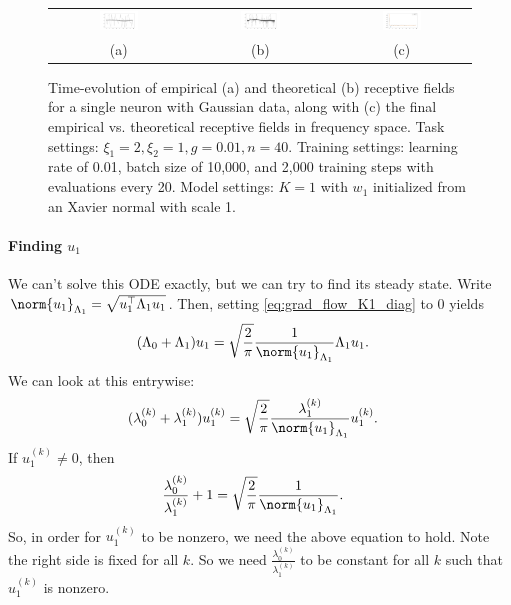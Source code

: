 \documentclass{article}
\begin{document}
\begin{figure}
  \centering
  \begin{tabular}{ccc}
    \includegraphics[width=0.3\textwidth]{../figs/math/long_range_experiment.png}
    & \includegraphics[width=0.3\textwidth]{../figs/math/long_range_theory.png}
    & \includegraphics[width=0.3\textwidth]{../figs/math/theory_vs_experiment.png} \\
    (a) & (b) & (c)
  \end{tabular}
  \caption{
    Time-evolution of empirical (a) and theoretical (b) receptive fields for a single neuron with Gaussian data, along with (c) the final empirical vs. theoretical receptive fields in frequency space.
    Task settings: $\xi_1 = 2, \xi_2 = 1, g = 0.01, n = 40$.
    Training settings: learning rate of 0.01, batch size of 10,000, and 2,000 training steps with evaluations every 20.
    Model settings: $K=1$ with $w_1$ initialized from an Xavier normal with scale 1.
    }
  \label{fig:K1_receptive_fields}
\end{figure}

\paragraph*{Finding $u_1$}
We can't solve this ODE exactly, but we can try to find its steady state.
Write $\norm{u_1}_{\Lambda_1} = \sqrt{u_1^\top \Lambda_1 u_1}$.
Then, setting \cref{eq:grad_flow_K1_diag} to 0 yields
\begin{align}
  (\Lambda_0 + \Lambda_1) u_1 &= \sqrt{\frac{2}{\pi}} \frac{1}{\norm{u_1}_{\Lambda_1}} \Lambda_1 u_1.
\end{align}
We can look at this entrywise:
\begin{align}
  (\lambda_0^{(k)} + \lambda_1^{(k)}) u_1^{(k)} &= \sqrt{\frac{2}{\pi}} \frac{\lambda_1^{(k)}}{\norm{u_1}_{\Lambda_1}} u_1^{(k)}.
\end{align}
If $u_1^{(k)} \neq 0$, then
\begin{align}
  \frac{ \lambda_0^{(k)} }{ \lambda_1^{(k)} } + 1 &= \sqrt{\frac{2}{\pi}} \frac{1}{\norm{u_1}_{\Lambda_1}}.
\end{align}
So, in order for $u_1^{(k)}$ to be nonzero, we need the above equation to hold.
Note the right side is fixed for all $k$.
So we need $\frac{ \lambda_0^{(k)} }{ \lambda_1^{(k)} }$ to be constant for all $k$ such that $u_1^{(k)}$ is nonzero.
\end{document}
